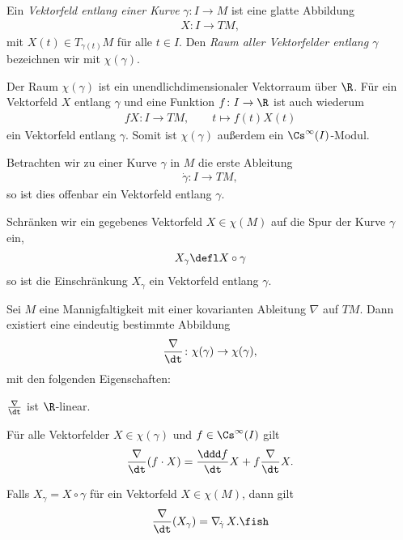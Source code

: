 \documentclass[%
	paper=a5,%
	fleqn,%
	DIV=18,%
	BCOR=0mm,
	fontsize=11pt,
	titlepage=false,%
	bibliography=totoc,
	DIV=18,%
	twoside=true,
	pdftitle=Riemannsche Geometrie,
	pdfauthor=Uwe Semmelmann,
	numbers=noendperiod]%
	{scrbook}
\begin{document}
\begin{defn}
Ein \emph{Vektorfeld entlang einer Kurve}  $\gamma\colon I\to M$ ist eine glatte
Abbildung
\begin{align*}
X: I\to TM,
\end{align*}
mit $X(t)\in T_{\gamma(t)}M$ für alle $t\in I$. Den \emph{Raum aller
Vektorfelder entlang $\gamma$} bezeichnen wir mit $\chi(\gamma)$.\fish
\end{defn}

\begin{rem}
Der Raum $\chi(\gamma)$ ist ein unendlichdimensionaler Vektorraum über $\R$. Für
ein Vektorfeld $X$ entlang $\gamma$ und eine Funktion $f\colon I\to \R$ ist auch
wiederum
\begin{align*}
fX : I\to TM,\qquad t\mapsto f(t)X(t)
\end{align*}
ein Vektorfeld entlang $\gamma$. Somit ist $\chi(\gamma)$ außerdem ein
$\Cs^\infty(I)$-Modul.\map
\end{rem}

\begin{ex}
\begin{exenum}
\item Betrachten wir zu einer Kurve $\gamma$ in $M$ die erste Ableitung
\begin{align*}
\dot{\gamma}\colon I\to TM,
\end{align*} 
so ist dies offenbar ein Vektorfeld entlang $\gamma$.
\item Schränken wir ein gegebenes Vektorfeld $X\in\chi(M)$ auf die Spur der
Kurve $\gamma$ ein,
\begin{align*}
X_\gamma \defl X\circ \gamma 
\end{align*}
so ist die Einschränkung $X_\gamma$ ein Vektorfeld entlang $\gamma$.\boxc
\end{exenum}
\end{ex}

\begin{prop}
Sei $M$ eine Mannigfaltigkeit mit einer kovarianten Ableitung $\nabla$ auf $TM$.
Dann existiert eine eindeutig bestimmte Abbildung
\begin{align*}
\frac{\nabla}{\dt} \colon \chi(\gamma)\to \chi(\gamma),
\end{align*}
mit den folgenden Eigenschaften:
\begin{propenum}
\item $\frac{\nabla}{\dt}$ ist $\R$-linear.
\item Für alle Vektorfelder $X\in\chi(\gamma)$ und $f\in\Cs^\infty(I)$ gilt
\begin{align*}
\frac{\nabla}{\dt}(f\cdot X) = \frac{\ddd f}{\dt}X + f \frac{\nabla}{\dt}X.
\end{align*}
\item Falls $X_\gamma = X\circ \gamma$ für ein Vektorfeld $X\in\chi(M)$, dann
gilt
\begin{align*}
\frac{\nabla}{\dt}(X_\gamma) = \nabla_{\!\dot{\gamma}}\,X.\fish
\end{align*}
\end{propenum}
\end{prop}
\end{document}
